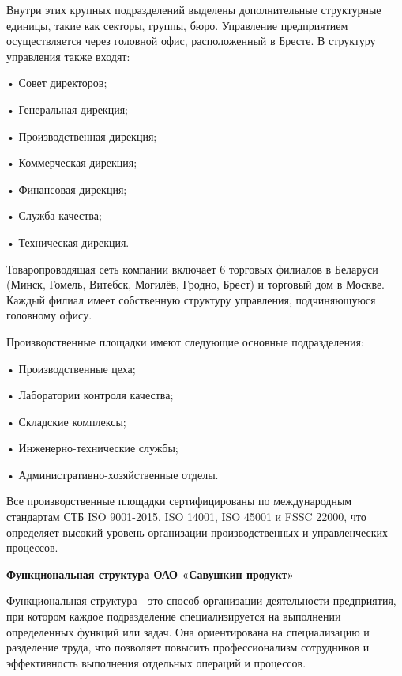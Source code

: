 {  \par \redline Внутри этих крупных подразделений выделены дополнительные структурные единицы, такие как секторы, группы, бюро. Управление предприятием осуществляется через головной офис, расположенный в Бресте. В структуру управления также входят:
  
  \par \redline • Совет директоров;
  \par \redline • Генеральная дирекция;
  \par \redline • Производственная дирекция;
  \par \redline • Коммерческая дирекция;
  \par \redline • Финансовая дирекция;
  \par \redline • Служба качества;
  \par \redline • Техническая дирекция.

  \par \redline Товаропроводящая сеть компании включает 6 торговых филиалов в Беларуси (Мин\-ск, Гомель, Витебск, Могилёв, Гродно, Брест) и торговый дом в Москве. Каждый филиал имеет собственную структуру управления, подчиняющуюся головному офису.

  \par \redline Производственные площадки имеют следующие основные подразделения:
  
  \par \redline • Производственные цеха;
  \par \redline • Лаборатории контроля качества;
  \par \redline • Складские комплексы;
  \par \redline • Инженерно-технические службы;
  \par \redline • Административно-хозяйственные отделы.

  \par \redline Все производственные площадки сертифицированы по международным стандартам СТБ ISO 9001-2015, ISO 14001, ISO 45001 и FSSC 22000, что определяет высокий уровень организации производственных и управленческих процессов.

  \par \redline \textbf{Функциональная структура ОАО «Савушкин продукт»}

  \par \redline Функциональная структура - это способ организации деятельности предприятия, при котором каждое подразделение специализируется на выполнении определенных функций или задач. Она ориентирована на специализацию и разделение труда, что позволяет повысить профессионализм сотрудников и эффективность выполнения отдельных операций и процессов.

}
